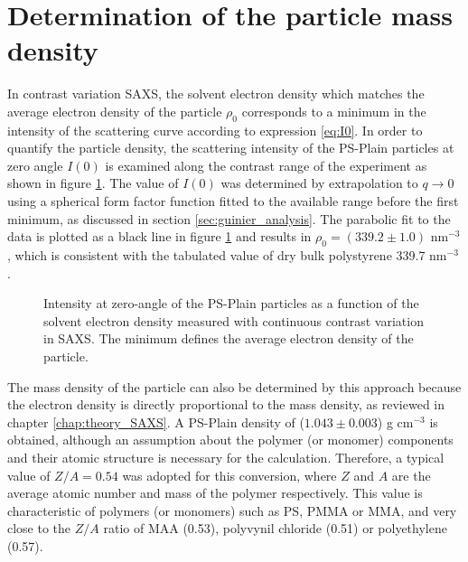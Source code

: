 \section{Determination of the particle mass density}
\label{sec:physical_density}
In contrast variation SAXS, the solvent electron density which matches the average electron density of the particle $\rho_0$ corresponds to a minimum in the intensity of the scattering curve  according to expression \ref{eq:I0}. In order to quantify the particle density, the scattering intensity of the PS-Plain particles at zero angle $I(0)$ is examined along the contrast range of the experiment as shown in figure \ref{fig:PSPlainAverageDensity}. The value of $I(0)$ was determined by extrapolation to $q\rightarrow 0$ using a spherical form factor function fitted to the available range before the first minimum, as discussed in section \ref{sec:guinier_analysis}. The parabolic fit to the data is plotted as a black line in figure \ref{fig:PSPlainAverageDensity} and results in $\rho_0=\left(339.2\pm1.0\right)$ nm$^{-3}$, which is consistent with the tabulated value of dry bulk polystyrene 339.7 nm$^{-3}$ \citep{dingenouts_analysis_1999}.


\begin{figure}
	\begin{center}
		
	\end{center}
	\caption[Zero-angle intensity of the PS-Plain particles.]{Intensity at zero-angle of the PS-Plain particles as a function of the solvent electron density measured with continuous contrast variation in SAXS. The minimum defines the average electron density of the particle.}
	\label{fig:PSPlainAverageDensity}
\end{figure}

The mass density of the particle can also be determined by this approach because the electron density is directly proportional to the mass density, as reviewed in chapter \ref{chap:theory_SAXS}. A PS-Plain density of ($1.043\pm0.003$) g cm$^{-3}$ is obtained, although an assumption about the polymer (or monomer) components and their atomic structure is necessary for the calculation. Therefore, a typical value of $Z/A=0.54$ was adopted for this conversion, where $Z$ and $A$ are the average atomic number and mass of the polymer respectively. This value is characteristic of polymers (or monomers) such as PS, PMMA or MMA, and very close to the $Z/A$ ratio of MAA (0.53), polyvynil chloride (0.51) or polyethylene (0.57).

